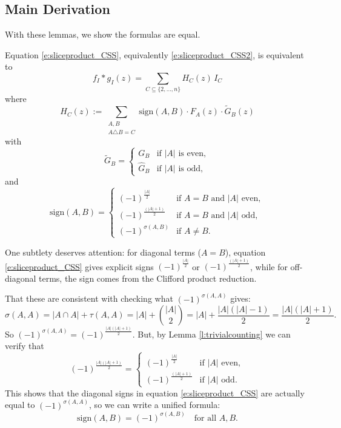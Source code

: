 \documentclass[11pt]{amsart}
\begin{document}
\subsection{Main Derivation}

With these lemmas, we show the formulas are equal.
\begin{prop}
\label{prop:productformula}
Equation \eqref{e:sliceproduct_CSS}, equivalently \eqref{e:sliceproduct_CSS2}, is equivalent to
\[
f_I * g_I(z) = \sum_{C \subseteq \{2,\ldots,n\}} H_C(z) \, I_C
\]
where
\[
H_C(z) := \sum_{\substack{A, B \\ A \triangle B = C}} \mathrm{sign}(A,B) \cdot F_A(z) \cdot \tilde{G}_B(z)
\]
with
\[
\tilde{G}_B =
\begin{cases}
G_B & \text{if } |A| \text{ is even}, \\
\hat{G}_B & \text{if } |A| \text{ is odd},
\end{cases}
\]
and
\[
\mathrm{sign}(A, B) =
\begin{cases}
(-1)^{\frac{|A|}{2}} & \text{if } A = B \text{ and } |A| \text{ even}, \\
(-1)^{\frac{(|A|+1)}{2}} & \text{if } A = B \text{ and } |A| \text{ odd}, \\
(-1)^{\sigma(A,B)} & \text{if } A \neq B.
\end{cases}
\]
\end{prop}

One subtlety deserves attention: for diagonal terms ($A = B$), equation \eqref{e:sliceproduct_CSS} gives explicit signs $(-1)^{\frac{|A|}{2}}$ or $(-1)^{\frac{(|A|+1)}{2}}$, while for off-diagonal terms, the sign comes from the Clifford product reduction.

That these are consistent with checking what $(-1)^{\sigma(A,A)}$ gives:
\[
\sigma(A, A) = |A \cap A| + \tau(A, A) = |A| + \binom{|A|}{2} = |A| + \frac{|A|(|A|-1)}{2} = \frac{|A|(|A|+1)}{2}.
\]
So $(-1)^{\sigma(A,A)} = (-1)^{\frac{|A|(|A|+1)}{2}}$.  But, by Lemma \ref{l:trivialcounting} we can verify that
\[
(-1)^{\frac{|A|(|A|+1)}{2}} =
\begin{cases}
(-1)^{\frac{|A|}{2}} & \text{if } |A| \text{ even}, \\
(-1)^{\frac{(|A|+1)}{2}} & \text{if } |A| \text{ odd}.
\end{cases}
\]
This shows that the diagonal signs in equation \eqref{e:sliceproduct_CSS} are actually equal to $(-1)^{\sigma(A,A)}$, so we can write a unified formula:
\[
\mathrm{sign}(A, B) = (-1)^{\sigma(A,B)} \quad \text{for all } A, B.
\]
\end{document}
